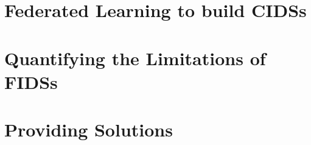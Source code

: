 \documentclass{these-dbl}
\begin{document}



\clearemptydoublepage


\frontmatter
\clearemptydoublepage
\renewcommand{\contentsname}{Table of Contents}
\tableofcontents %

\mainmatter

\clearemptydoublepage


\clearemptydoublepage
\part{Federated Learning to build CIDSs\label{part:fids}}

\clearemptydoublepage


\clearemptydoublepage


\clearemptydoublepage
\part{Quantifying the Limitations of FIDSs\label{part:limitations}}

\clearemptydoublepage


\clearemptydoublepage


\clearemptydoublepage
\part{Providing Solutions\label{part:solutions}}

\clearemptydoublepage


\clearemptydoublepage


\clearemptydoublepage
{}


\backmatter
\clearemptydoublepage
{} %


\printbibliography


\clearemptydoublepage
\cleartoevenpage[\thispagestyle{empty}]

\end{document}
